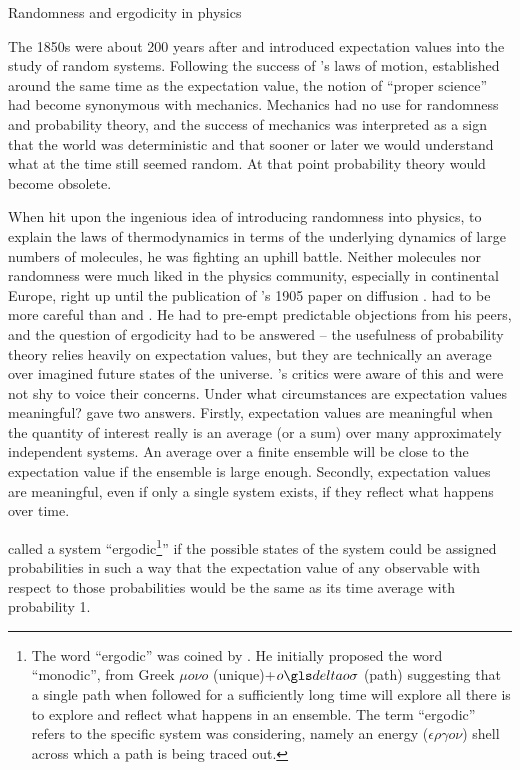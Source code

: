 \begin{history}{Randomness and ergodicity in physics}

The 1850s were about 200 years after  and  introduced expectation 
values into the study of random systems. Following the success of 's 
laws of motion, established around the same time as the expectation value, 
the notion of ``proper science'' had become synonymous with 
mechanics. Mechanics had no use for randomness and probability 
theory, and the success of mechanics was interpreted as a sign that 
the world was deterministic and that sooner or later we would understand 
what at the time still seemed random. At that point probability theory would 
become obsolete. 

When  hit upon the ingenious idea of introducing randomness into 
physics, to explain the laws of thermodynamics in terms of the underlying 
dynamics of large numbers of molecules, he was fighting an uphill battle. 
Neither molecules nor randomness were much liked in the physics 
community, especially in continental Europe, right up until the publication of 
's 1905 paper on diffusion \cite{Einstein1905}.  had to be 
more careful than  and . He had to pre-empt
predictable objections from his peers, and the question of ergodicity had to be 
answered -- the usefulness of probability theory relies heavily on expectation 
values, but they are technically an average over imagined future states of the 
universe. 's critics were aware of this and were not shy to voice their
concerns. Under what circumstances are expectation values meaningful? 
 gave two answers. Firstly, expectation values are meaningful when 
the quantity of interest really is an average (or a sum) over many approximately 
independent systems. An average over a finite ensemble will be close to the 
expectation value if the ensemble is large enough. Secondly, expectation values 
are meaningful, even if only a single system exists, if they reflect what happens over time. 

 called a system ``ergodic\footnote{The word ``ergodic'' was coined by . 
He initially proposed the word ``monodic'', from Greek $\mu o \nu o$ (unique)+$o\d o \sigma$ (path) suggesting 
that a single path when followed for a sufficiently long time will explore all there is to explore and reflect what happens 
in an ensemble. The term ``ergodic'' refers to the specific system  was considering, namely an energy 
($\epsilon \rho \gamma o \nu$) shell across which a path is being traced out.}'' if the possible 
states of the system could be assigned probabilities in such a way that
the expectation value of any observable with respect to those probabilities would 
be the same as its time average with probability 1.
\end{history}

